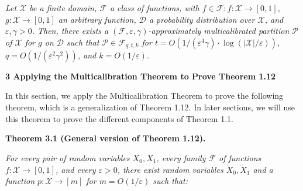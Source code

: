 \emph{Let $\mathcal{X}$ be a finite domain, $\mathcal{F}$ a class of functions, with $f\in\mathcal{F}:f:\mathcal{X}\rightarrow[0,1]$, $g:\mathcal{X}\rightarrow[0,1]$ an arbitrary function, $\mathcal{D}$ a probability distribution over $\mathcal{X}$, and $\varepsilon,\gamma>0$. Then, there exists a $(\mathcal{F},\varepsilon,\gamma)$-approximately multicalibrated partition $\mathcal{P}$ of $\mathcal{X}$ for $g$ on $\mathcal{D}$ such that $\mathcal{P}\in\mathcal{F}_{q,t,k}$ for $t=O(1/(\varepsilon^{4}\gamma)\cdot\log(|\mathcal{X}|/\varepsilon))$, $q=O(1/(\varepsilon^{2}\gamma^{2}))$, and $k=O(1/\varepsilon)$.}\par








\par\medskip\noindent\textbf{
3 Applying the Multicalibration Theorem to Prove Theorem 1.12
}\par




In this section, we apply the Multicalibration Theorem to prove the following theorem, which is a generalization of Theorem 1.12. In later sections, we will use this theorem to prove the different components of Theorem 1.1.\par





\par\medskip\noindent\textbf{
\textbf{Theorem 3.1}\textbf{ }(General version of Theorem 1.12)\textbf{.}
}\par



\emph{For every pair of random variables $X_{0},X_{1}$, every family $\mathcal{F}$ of functions $f:\mathcal{X}\to[0,1]$, and every $\varepsilon>0$, there exist random variables $\widetilde{X}_{0},\widetilde{X}_{1}$ and a function $p:\mathcal{X}\to[m]$ for $m=O(1/\varepsilon)$ such that:}\par


